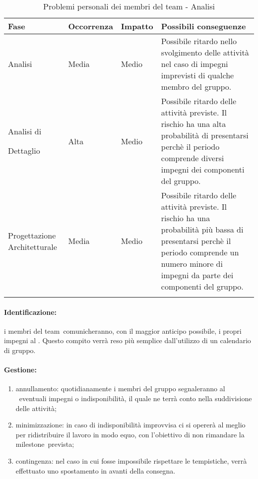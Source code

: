 \documentclass[../PianoProgetto.tex]{subfiles}
\begin{document}
	\begin{table}[h]
		\centering
		\begin{tabularx}{\textwidth}{F O O P}
			\toprule
			\textbf{Fase} & \textbf{Occorrenza} & \textbf{Impatto} & \textbf{Possibili conseguenze}\\
			\midrule
			Analisi & Media & Medio & Possibile ritardo nello svolgimento delle attività nel caso di impegni imprevisti di qualche membro del gruppo. \\
			\midrule
			Analisi di \par Dettaglio & Alta & Medio & Possibile ritardo delle attività previste. Il rischio ha una alta probabilità di presentarsi perchè il periodo comprende diversi impegni dei componenti del gruppo.\\
			\midrule
			Progettazione Architetturale & Media & Medio & Possibile ritardo delle attività previste. Il rischio ha una probabilità più bassa di presentarsi perchè il periodo comprende un numero minore di impegni da parte dei componenti del gruppo.\\
			\bottomrule
		\end{tabularx}
		\caption{Problemi personali dei membri del team - Analisi}
		\label{tab:Problemi personali dei membri del team - Analisi}	
	\end{table}
		
	\paragraph*{Identificazione:} i membri del team\g\ comunicheranno, con il maggior anticipo possibile, i propri impegni al \responsabilediprogetto . Questo compito verrà reso più semplice dall'utilizzo di un calendario di gruppo. 
	
	\paragraph*{Gestione:}
	\begin{enumerate}
		\item annullamento: quotidianamente i membri del gruppo segnaleranno al \responsabilediprogetto\ eventuali impegni o indisponibilità, il quale ne terrà conto nella suddivisione delle attività;
		\item minimizzazione: in caso di indisponibilità improvvisa ci si opererà al meglio per ridistribuire il lavoro in modo equo, con l'obiettivo di non rimandare la milestone\g\ prevista;
		\item contingenza: nel caso in cui fosse impossibile rispettare le tempistiche, verrà effettuato uno spostamento in avanti della consegna.
	\end{enumerate}
			
\end{document}
